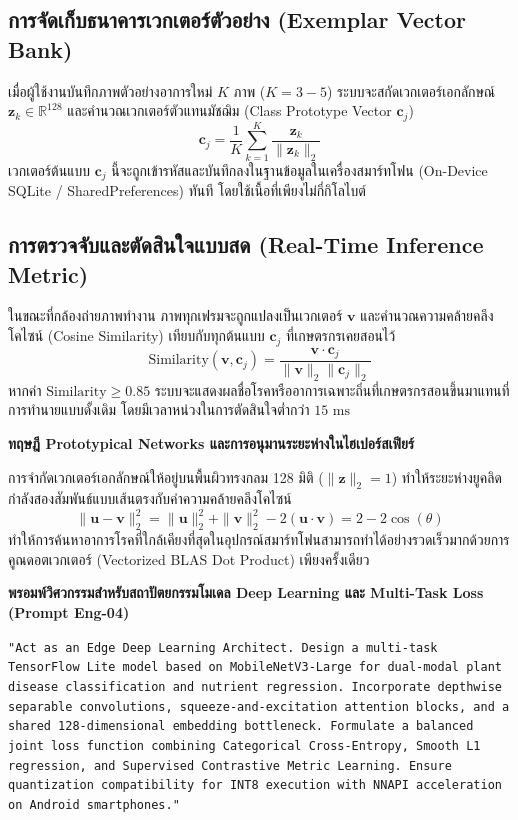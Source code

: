 \subsection{การจัดเก็บธนาคารเวกเตอร์ตัวอย่าง (Exemplar Vector Bank)}
เมื่อผู้ใช้งานบันทึกภาพตัวอย่างอาการใหม่ $K$ ภาพ ($K = 3 - 5$) ระบบจะสกัดเวกเตอร์เอกลักษณ์ $\mathbf{z}_k \in \mathbb{R}^{128}$ และคำนวณเวกเตอร์ตัวแทนมัชฌิม (Class Prototype Vector $\mathbf{c}_j$)
\begin{equation}
  \mathbf{c}_j = \frac{1}{K} \sum_{k=1}^{K} \frac{\mathbf{z}_k}{\|\mathbf{z}_k\|_2}
\end{equation}
เวกเตอร์ต้นแบบ $\mathbf{c}_j$ นี้จะถูกเข้ารหัสและบันทึกลงในฐานข้อมูลในเครื่องสมาร์ทโฟน (On-Device SQLite / SharedPreferences) ทันที โดยใช้เนื้อที่เพียงไม่กี่กิโลไบต์

\subsection{การตรวจจับและตัดสินใจแบบสด (Real-Time Inference Metric)}
ในขณะที่กล้องถ่ายภาพทำงาน ภาพทุกเฟรมจะถูกแปลงเป็นเวกเตอร์ $\mathbf{v}$ และคำนวณความคล้ายคลึงโคไซน์ (Cosine Similarity) เทียบกับทุกต้นแบบ $\mathbf{c}_j$ ที่เกษตรกรเคยสอนไว้
\begin{equation}
  \text{Similarity}(\mathbf{v}, \mathbf{c}_j) = \frac{\mathbf{v} \cdot \mathbf{c}_j}{\|\mathbf{v}\|_2 \|\mathbf{c}_j\|_2}
\end{equation}
หากค่า $\text{Similarity} \ge 0.85$ ระบบจะแสดงผลชื่อโรคหรืออาการเฉพาะถิ่นที่เกษตรกรสอนขึ้นมาแทนที่การทำนายแบบดั้งเดิม โดยมีเวลาหน่วงในการตัดสินใจต่ำกว่า $15\text{ ms}$

\begin{theorybox}
\textbf{ทฤษฎี Prototypical Networks และการอนุมานระยะห่างในไฮเปอร์สเฟียร์}\par
การจำกัดเวกเตอร์เอกลักษณ์ให้อยู่บนพื้นผิวทรงกลม 128 มิติ ($\|\mathbf{z}\|_2 = 1$) ทำให้ระยะห่างยูคลิดกำลังสองสัมพันธ์แบบเส้นตรงกับค่าความคล้ายคลึงโคไซน์
\begin{equation}
  \|\mathbf{u} - \mathbf{v}\|_2^2 = \|\mathbf{u}\|_2^2 + \|\mathbf{v}\|_2^2 - 2(\mathbf{u} \cdot \mathbf{v}) = 2 - 2 \cos(\theta)
\end{equation}
ทำให้การค้นหาอาการโรคที่ใกล้เคียงที่สุดในอุปกรณ์สมาร์ทโฟนสามารถทำได้อย่างรวดเร็วมากด้วยการคูณดอตเวกเตอร์ (Vectorized BLAS Dot Product) เพียงครั้งเดียว
\end{theorybox}

\begin{promptbox}
\textbf{พรอมพ์วิศวกรรมสำหรับสถาปัตยกรรมโมเดล Deep Learning และ Multi-Task Loss (Prompt Eng-04)}\par
\texttt{"Act as an Edge Deep Learning Architect. Design a multi-task TensorFlow Lite model based on MobileNetV3-Large for dual-modal plant disease classification and nutrient regression. Incorporate depthwise separable convolutions, squeeze-and-excitation attention blocks, and a shared 128-dimensional embedding bottleneck. Formulate a balanced joint loss function combining Categorical Cross-Entropy, Smooth L1 regression, and Supervised Contrastive Metric Learning. Ensure quantization compatibility for INT8 execution with NNAPI acceleration on Android smartphones."}
\end{promptbox}
